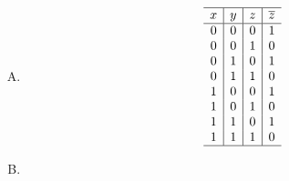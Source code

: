 {{        %
        \begin{practices}
            \begin{enumerate}[A.]
                \item
                {
                    \begin{table}[H]
                        \centering

                        \[
                            \begin{array}{c|c|c|c}
                                \hline
                                x & y & z & \overline{z} \\
                                \hline
                                0 & 0 & 0 & 1 \\
                                0 & 0 & 1 & 0 \\
                                0 & 1 & 0 & 1 \\
                                0 & 1 & 1 & 0 \\
                                1 & 0 & 0 & 1 \\
                                1 & 0 & 1 & 0 \\
                                1 & 1 & 0 & 1 \\
                                1 & 1 & 1 & 0 \\
                                \hline
                            \end{array}
                        \]
                    \end{table}
                }
                \item
                {
                    \begin{table}[H]
                        \centering


\end{table}}
\end{enumerate}
\end{practices}}}
